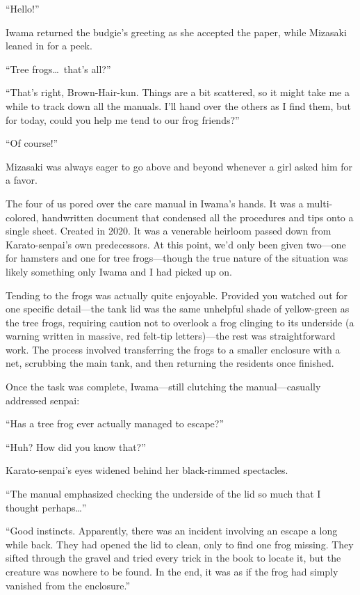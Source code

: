 \documentclass[
    a4paper,
    12pt,
    twoside,
    openany,
    UTF8,
    fontset=windows
]{ctexbook}
\begin{document}
``Hello!''

Iwama returned the budgie's greeting as she accepted the paper, while Mizasaki leaned in for a peek.

``Tree frogs\dots\ that's all?''

``That's right, Brown-Hair-kun. Things are a bit scattered, so it might take me a while to track down all the manuals. I'll hand over the others as I find them, but for today, could you help me tend to our frog friends?''

``Of course!''

Mizasaki was always eager to go above and beyond whenever a girl asked him for a favor.

The four of us pored over the care manual in Iwama's hands. It was a multi-colored, handwritten document that condensed all the procedures and tips onto a single sheet. Created in 2020. It was a venerable heirloom passed down from Karato-senpai's own predecessors. At this point, we'd only been given two---one for hamsters and one for tree frogs---though the true nature of the situation was likely something only Iwama and I had picked up on.

Tending to the frogs was actually quite enjoyable. Provided you watched out for one specific detail---the tank lid was the same unhelpful shade of yellow-green as the tree frogs, requiring caution not to overlook a frog clinging to its underside (a warning written in massive, red felt-tip letters)---the rest was straightforward work. The process involved transferring the frogs to a smaller enclosure with a net, scrubbing the main tank, and then returning the residents once finished.

Once the task was complete, Iwama---still clutching the manual---casually addressed senpai:

``Has a tree frog ever actually managed to escape?''

``Huh? How did you know that?''

Karato-senpai's eyes widened behind her black-rimmed spectacles.

``The manual emphasized checking the underside of the lid so much that I thought perhaps\dots''

``Good instincts. Apparently, there was an incident involving an escape a long while back. They had opened the lid to clean, only to find one frog missing. They sifted through the gravel and tried every trick in the book to locate it, but the creature was nowhere to be found. In the end, it was as if the frog had simply vanished from the enclosure.''
\end{document}
